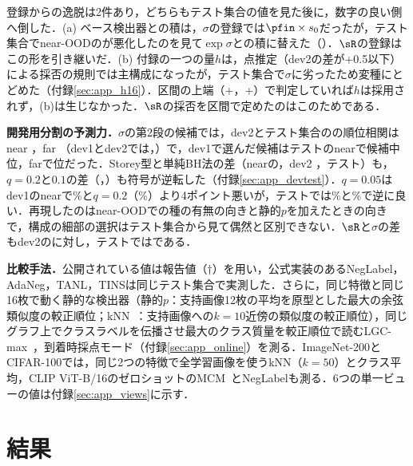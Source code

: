 登録からの逸脱は2件あり，どちらもテスト集合の値を見た後に，数字の良い側へ倒した．(a) ベース検出器との積は，$\sigma$の登録では$\pfin\times s_0$だったが，テスト集合でnear-OODの\FPR{}が悪化したのを見て$\exp\sigma$との積に替えた（）．$\sR$の登録はこの形を引き継いだ．(b) 付録の一つの量$h$は，点推定（dev2の差が+0.5以下）による採否の規則では主構成になったが，テスト集合で$\sigma$に劣ったため変種にとどめた（付録\ref{sec:app_h16}）．区間の上端（+\NRHsUpperNear，+\NRHsUpperFar）で判定していれば$h$は採用されず，(b)は生じなかった．$\sR$の採否を区間で定めたのはこのためである．

\textbf{開発用分割の予測力．}$\sigma$の第2段の\NRDtNCand{}候補では，dev2とテスト集合の\FPR{}の順位相関はnear \NRDtNearSpDevTwoTest{}，far \NRDtFarSpDevTwoTest{}（dev1とdev2では\NRDtNearSpDevOneDevTwo{}，\NRDtFarSpDevOneDevTwo{}）で，dev1で選んだ候補はテストのnearで\NRDtNCand{}候補中\NRDtNearRankOnTest{}位，farで\NRDtFarRankChosen{}位だった．Storey型と単純BH法の差（nearの\FPR{}，dev2 \NRDtNearStoreyBhDevTwo{}，テスト\NRDtNearStoreyBhTest{}）も，$q{=}0.2$と$0.1$の差（\NRDtNearQDevTwo{}，\NRDtNearQTest{}）も符号が逆転した（付録\ref{sec:app_devtest}）．$q{=}0.05$はdev1のnearで\NRDtQFiveDevOneNear\%と$q{=}0.2$（\NRDtQTwentyDevOneNear\%）より4ポイント悪いが，テストでは\NRDtQFiveTestNear\%と\NRDtQTwentyTestNear\%で逆に良い．再現したのはnear-OODでの種の有無の向きと静的$p$を加えたときの向きで，構成の細部の選択はテスト集合から見て偶然と区別できない．$\sR$と$\sigma$の差もdev2の\NRDevTwoNearD{}に対し，テストでは\NRAloneNearDSig{}である．

\textbf{比較手法．}公開されている値は報告値（$\dagger$）を用い，公式実装のあるNegLabel，AdaNeg，TANL，TINSは同じテスト集合で実測した．さらに，同じ特徴と同じ16枚で動く静的な検出器（静的$p$：支持画像12枚の平均を原型とした最大の余弦類似度の較正順位；kNN~\cite{sun2022knn}：支持画像への$k{=}10$近傍の類似度の較正順位），同じグラフ上でクラスラベルを伝播させ最大のクラス質量を較正順位で読むLGC-max~\cite{zhou2004lgc,liu2019tpn}，到着時採点モード（付録\ref{sec:app_online}）を測る．ImageNet-200とCIFAR-100では，同じ2つの特徴で全学習画像を使うkNN（$k{=}50$）とクラス平均，CLIP ViT-B/16のゼロショットのMCM~\cite{ming2022mcm}とNegLabelも測る．6つの単一ビューの値は付録\ref{sec:app_views}に示す．

\section{結果}
